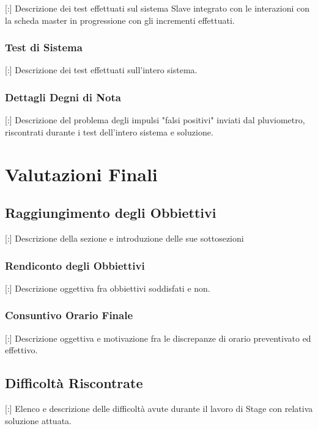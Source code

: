 \documentclass[11pt]{book}              %
\begin{document}
[:] Descrizione dei test effettuati sul sistema Slave integrato con le interazioni con la scheda master in progressione con gli incrementi effettuati.

\subsection{Test di Sistema}

[:] Descrizione dei test effettuati sull'intero sistema.

\subsection{Dettagli Degni di Nota}

[:] Descrizione del problema degli impulsi "falsi positivi" inviati dal pluviometro, riscontrati durante i test dell'intero sistema e soluzione.

\chapter{Valutazioni Finali}
\thispagestyle{fancy} 

\section{Raggiungimento degli Obbiettivi}

[:] Descrizione della sezione e introduzione delle sue sottosezioni

\subsection{Rendiconto degli Obbiettivi}

[:] Descrizione oggettiva fra obbiettivi soddisfati e non.

\subsection{Consuntivo Orario Finale}

[:] Descrizione oggettiva e motivazione fra le discrepanze di orario preventivato ed effettivo.

\section{Difficoltà Riscontrate}

[:] Elenco e descrizione delle difficoltà avute durante il lavoro di Stage con relativa soluzione attuata.
\end{document}
